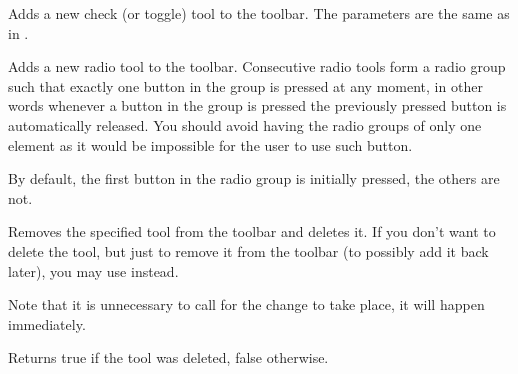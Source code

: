 
Adds a new check (or toggle) tool to the toolbar. The parameters are the same
as in .



\label{wxtoolbaraddradiotool}


Adds a new radio tool to the toolbar. Consecutive radio tools form a radio
group such that exactly one button in the group is pressed at any moment, in
other words whenever a button in the group is pressed the previously pressed
button is automatically released. You should avoid having the radio groups of
only one element as it would be impossible for the user to use such button.

By default, the first button in the radio group is initially pressed, the
others are not.



\label{wxtoolbardeletetool}


Removes the specified tool from the toolbar and deletes it. If you don't want
to delete the tool, but just to remove it from the toolbar (to possibly add it
back later), you may use  instead.

Note that it is unnecessary to call  for the
change to take place, it will happen immediately.

Returns true if the tool was deleted, false otherwise.

